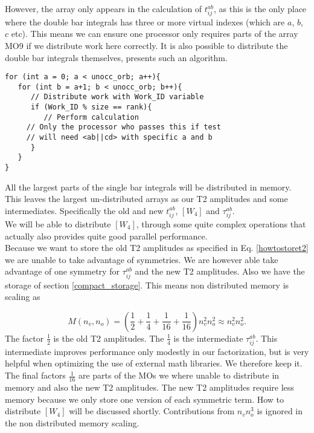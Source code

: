 However, the array only appears in the calculation of $t_{ij}^{ab}$, as this is the only place where the double bar integrals has three or more virtual indexes (which are $a$, $b$, $c$ etc). This means we can ensure one processor only requires parts of the array MO9 if we distribute work here correctly. It is also possible to distribute the double bar integrals themselves, \cite{ccsd_minne_distribuert_double_bar_artikkel} presents such an algorithm. \\

\begin{lstlisting}
for (int a = 0; a < unocc_orb; a++){
   for (int b = a+1; b < unocc_orb; b++){
      // Distribute work with Work_ID variable
      if (Work_ID % size == rank){
         // Perform calculation
     // Only the processor who passes this if test
     // will need <ab||cd> with specific a and b
      }
   }
}
\end{lstlisting}

All the largest parts of the single bar integrals will be distributed in memory. This leaves the largest un-distributed arrays as our T2 amplitudes and some intermediates. Specifically the old and new $t_{ij}^{ab}$, $[W_4]$ and $\tau_{ij}^{ab}$. \\

We will be able to distribute $[W_4]$, through some quite complex operations that actually also provides quite good parallel performance. \\

Because we want to store the old T2 amplitudes as specified in Eq. \eqref{howtostoret2} we are unable to take advantage of symmetries. We are however able take advantage of one symmetry for $\tau_{ij}^{ab}$ and the new T2 amplitudes. Also we have the storage of section \ref{compact_storage}. This means non distributed memory is scaling as

\begin{equation}
M(n_v, n_o) = \left(\frac{1}{2} + \frac{1}{4} + \frac{1}{16} + \frac{1}{16} \right) n_v^2 n_o^2 \approx n_v^2 n_o^2 .
\end{equation}
The factor $\frac{1}{2}$ is the old T2 amplitudes. The $\frac{1}{4}$ is the intermediate $\tau_{ij}^{ab}$. This intermediate improves performance only modestly in our factorization, but is very helpful when optimizing the use of external math libraries. We therefore keep it. The final factors $\frac{1}{16}$ are parts of the MOs we where unable to distribute in memory and also the new T2 amplitudes. The new T2 amplitudes require less memory because we only store one version of each symmetric term. How to distribute $[W_4]$ will be discussed shortly. Contributions from $n_v n_o^3$ is ignored in the non distributed memory scaling.

